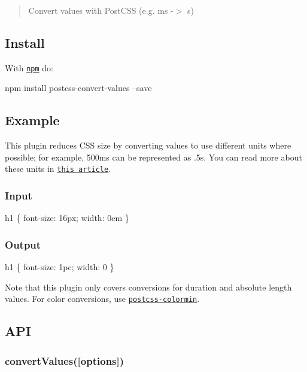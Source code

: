 \begin{quote}
Convert values with Post\+C\+SS (e.\+g. ms -\/$>$ s) \end{quote}


\subsection*{Install}

With \href{https://npmjs.org/package/postcss-convert-values}{\tt npm} do\+:


\begin{DoxyCode}
npm install postcss-convert-values --save
\end{DoxyCode}


\subsection*{Example}

This plugin reduces C\+SS size by converting values to use different units where possible; for example, {\ttfamily 500ms} can be represented as {\ttfamily .5s}. You can read more about these units in \href{https://css-tricks.com/the-lengths-of-css/}{\tt this article}.

\subsubsection*{Input}


\begin{DoxyCode}
h1 \{
    font-size: 16px;
    width: 0em
\}
\end{DoxyCode}


\subsubsection*{Output}


\begin{DoxyCode}
h1 \{
    font-size: 1pc;
    width: 0
\}
\end{DoxyCode}


Note that this plugin only covers conversions for duration and absolute length values. For color conversions, use \href{https://github.com/ben-eb/postcss-colormin}{\tt postcss-\/colormin}.

\subsection*{A\+PI}

\subsubsection*{convert\+Values(\mbox{[}options\mbox{]})}

